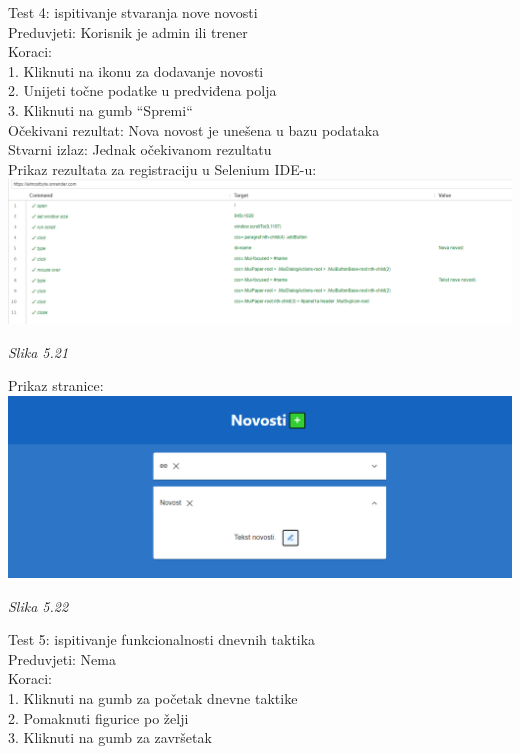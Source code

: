 \documentclass{article}
\begin{document}
	Test 4: ispitivanje stvaranja nove novosti\\
	Preduvjeti: Korisnik je admin ili trener\\
	Koraci:\\
	1. Kliknuti na ikonu za dodavanje novosti\\
	2. Unijeti točne podatke u predviđena polja\\
	3. Kliknuti na gumb “Spremi“\\
	
	Očekivani rezultat: Nova novost je unešena u bazu podataka\\  
	Stvarni izlaz: Jednak očekivanom rezultatu\\
	Prikaz rezultata za registraciju u Selenium IDE-u:\\
	
		\includegraphics[width=\columnwidth]{nova-novost}
	\begin{center}
		\textit{Slika 5.21}
	\end{center}
	\eject
	Prikaz stranice:\\
	
	\includegraphics[width=\columnwidth]{novost}
	\begin{center}
		\textit{Slika 5.22}
	\end{center}
	\eject
	
	Test 5: ispitivanje funkcionalnosti dnevnih taktika\\
	Preduvjeti: Nema\\
	Koraci:\\
	1. Kliknuti na gumb za početak dnevne taktike\\
	2. Pomaknuti figurice po želji\\
	3. Kliknuti na gumb za završetak\\
	
\end{document}

